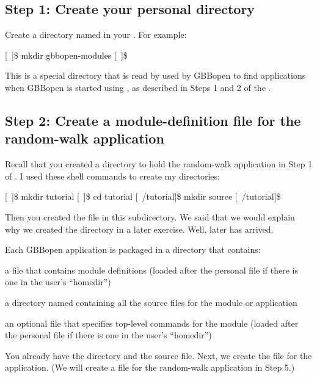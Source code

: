 \documentclass[10pt,twoside,english,pdftex]{article}
\begin{document}
\subsection*{Step 1: Create your personal  directory}

Create a directory named  in your .  For example:
%
\W\supp
\begin{example}
\textcolor{darkergray}{%
  [~]\$ \textcolor{black}{mkdir gbbopen-modules}
  [~]\$}
\end{example}
%
This is a special directory that is read by used by GBBopen to find
applications when GBBopen is started using
, as described in Steps 1 and 2
of the .

\subsection*{Step 2: Create a module-definition file for the random-walk application}

Recall that you created a directory to hold the random-walk application in
Step 1 of .  I used these
shell commands to create my directories:
%
\W\supp
\begin{example}
\textcolor{darkergray}{%
  [~]\$ mkdir tutorial
  [~]\$ cd tutorial
  [~/tutorial]\$ mkdir source
  [~/tutorial]\$}
\end{example}
%
Then you created the  file in this 
subdirectory. We said that we would explain why we created the 
directory in a later exercise.  Well, later has arrived.

Each GBBopen application is packaged in a directory that contains:
\begin{tightitemize}
\item a  file that contains module definitions (loaded
  after the personal  file if
  there is one in the user's ``homedir'')
\item a directory named  containing all the source files for the
  module or application
\item an optional  file that specifies top-level commands
  for the module (loaded after the personal  file
  if there is one in the user's ``homedir'')
\end{tightitemize}
%
You already have the  directory and the
 source file.  Next, we create the
 file for the application.  (We will create a
 file for the random-walk application in Step 5.)
\end{document}
